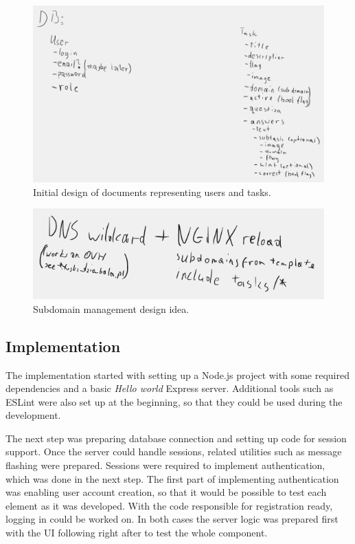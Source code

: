 \begin{figure}
	\centering
	\includegraphics[width=\textwidth]{img/init-db-struct.png}
	\caption{Initial design of documents representing users and tasks.}
	\label{fig:init-db-struct}
\end{figure}

\begin{figure}
	\centering
	\includegraphics[width=\textwidth]{img/subdomain-idea.png}
	\caption{Subdomain management design idea.}
	\label{fig:subdomain-idea}
\end{figure}

\subsection{Implementation}

The implementation started with setting up a Node.js project with some required dependencies and a basic \textit{Hello world} Express server. Additional tools such as ESLint were also set up at the beginning, so that they could be used during the development.

The next step was preparing database connection and setting up code for session support. Once the server could handle sessions, related utilities such as message flashing were prepared. Sessions were required to implement authentication, which was done in the next step. The first part of implementing authentication was enabling user account creation, so that it would be possible to test each element as it was developed. With the code responsible for registration ready, logging in could be worked on. In both cases the server logic was prepared first with the UI following right after to test the whole component.


